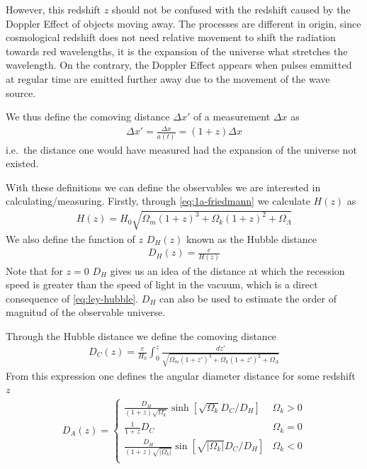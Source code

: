 However, this redshift $z$ should not be confused with the redshift caused by the Doppler Effect of objects moving away. The processes are different in origin, since cosmological redshift does not need relative movement to shift the radiation towards red wavelengths, it is the expansion of the universe what stretches the wavelength. On the contrary, the Doppler Effect appears when pulses emmitted at regular time are emitted further away due to the movement of the wave source.

We thus define the comoving distance $\Delta x'$ of a measurement $\Delta x$ as 
\begin{align}
	\Delta x' =\frac{\Delta x}{a(t)}= (1+z)\Delta x
\end{align}
i.e.\ the distance one would have measured had the expansion of the universe not existed.

With these definitions we can define  the observables we are interested in calculating/measuring. Firstly, through \eqref{eq:1a-friedmann} we calculate $H(z)$ as  
\begin{align}
	H(z) = H_0 \sqrt{\Omega_m(1+z)^3 + \Omega_k(1+z)^2 + \Omega_\Lambda} 
\end{align}
We also define the function of $z$ $D_H(z)$ known as the Hubble distance
\begin{align}
	D_H(z)  = \frac{c}{H(z)}
\end{align}
Note that for $z = 0$ $D_H$ gives us an idea of the distance at which the recession speed is greater than the speed of light in the vacuum, which is a direct consequence of \eqref{eq:ley-hubble}. $D_H$ can also be used to estimate the order of magnitud of the observable universe.

Through the Hubble distance we define the comoving distance 
\begin{align}
	D_C(z) = \frac{c}{H_0}\int_{0}^{z} \frac{dz'}{\sqrt{\Omega_m(1+z')^3 + \Omega_k(1+z')^2 + \Omega_\Lambda} } 
\end{align}
From this expression one defines the angular diameter distance for some redshift $z$
\begin{align}
	D_A(z) = \begin{cases}
		\frac{D_H}{\left( 1+z \right) \sqrt{\Omega_k} }\sinh \left[ \sqrt{\Omega_k} D_C /D_H \right]  	 &\Omega_k >0\\
		\frac{1}{1+z}D_C& \Omega_k =  0\\
		\frac{D_H}{\left( 1+z \right) \sqrt{|\Omega_k|}} \sin \left[ \sqrt{|\Omega_k|} D_C /D_H \right]  	 &\Omega_k <0\\
	\end{cases}
\end{align}

